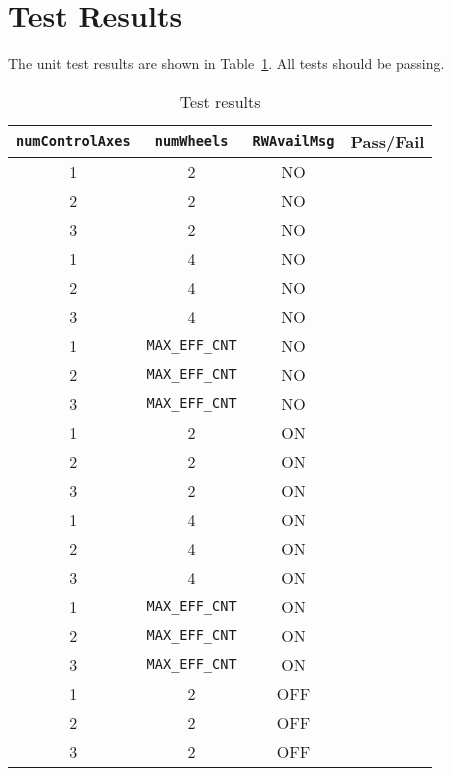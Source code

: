 \section{Test Results}
The unit test results are shown in Table~\ref{tab:results}.  All tests should be passing.
\begin{table}[ht]
	\caption{Test results}
	\label{tab:results}
	\centering \fontsize{10}{10}\selectfont
	\begin{tabular}{c | c | c | c } %
		\hline\hline
		{\tt numControlAxes} 		& {\tt numWheels}	& {\tt RWAvailMsg} 	&\textbf{Pass/Fail} \\ 
		\hline
	   1	& 2 & NO & \\ 
	   2	& 2 & NO & \\ 
	   3	& 2 & NO & \\ 
	   1	& 4 & NO & \\ 
	   2	& 4 & NO & \\ 
	   3	& 4 & NO & \\ 
	   1	& {\tt MAX\_EFF\_CNT} & NO & \\ 
	   2	& {\tt MAX\_EFF\_CNT}  & NO & \\ 
	   3	& {\tt MAX\_EFF\_CNT}  & NO & \\ 
	   1	& 2 & ON & \\ 
	   2	& 2 & ON & \\ 
	   3	& 2 & ON & \\ 
	   1	& 4 & ON & \\ 
	   2	& 4 & ON & \\ 
	   3	& 4 & ON & \\ 
	   1	& {\tt MAX\_EFF\_CNT} & ON & \\ 
	   2	& {\tt MAX\_EFF\_CNT}  & ON & \\ 
	   3	& {\tt MAX\_EFF\_CNT}  & ON & \\ 
	   1	& 2 & OFF & \\ 
	   2	& 2 & OFF & \\ 
	   3	& 2 & OFF & \\ 

\end{tabular}
\end{table}
